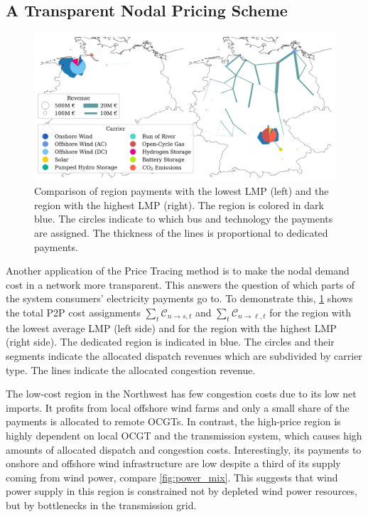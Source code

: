 \documentclass[11pt,twocolumn]{article}
\newcommand{\cost}{\mathcal{C}}
\newcommand{\allocategeneratorcost}[1][n \rightarrow s]{\cost_{#1, t}}
\newcommand{\allocatelinecost}[1][n \rightarrow \ell]{\cost_{#1, t}}
\begin{document}
\subsection{A Transparent Nodal Pricing Scheme}


\begin{figure}[h!]
    \includegraphics[width=\linewidth]{de50/allocated_payment_comparison}
    \caption{Comparison of region payments with the lowest \ac{LMP} (left) and the region with the highest \ac{LMP} (right). The region is colored in dark blue. The circles indicate to which bus and technology the payments are assigned. The thickness of the lines is proportional to dedicated payments.}
    \label{fig:direct-allocation}
\end{figure}

Another application of the Price Tracing method is to make the nodal demand cost in a network more transparent. This answers the question of which parts of the system consumers' electricity payments go to. To demonstrate this, \cref{fig:direct-allocation} shows the total \ac{P2P} cost assignments $\sum_t \allocategeneratorcost$ and $\sum_t  \allocatelinecost$ for the region with the lowest average \ac{LMP} (left side) and for the region with the highest \ac{LMP} (right side). The dedicated region is indicated in blue. The circles and their segments indicate the allocated dispatch revenues which are subdivided by carrier type. The lines indicate the allocated congestion revenue.

The low-cost region in the Northwest has few congestion costs due to its low net imports. It profits from local offshore wind farms and only a small share of the payments is allocated to remote \acp{OCGT}. In contrast, the high-price region is highly dependent on local \ac{OCGT} and the transmission system, which causes high amounts of allocated dispatch and congestion costs. Interestingly, its payments to  onshore and offshore wind infrastructure are low despite a third of its supply coming from wind power, compare \cref{fig:power_mix}. This suggests that wind power supply in this region is constrained not by depleted wind power resources, but by bottlenecks in the transmission grid.
\end{document}

